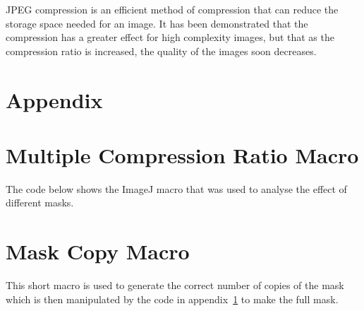 	JPEG compression is an efficient method of compression that can reduce the storage space needed for an image. It has been demonstrated that the compression has a greater effect for high complexity images, but that as the compression ratio is increased, the quality of the images soon decreases.

\section*{Appendix}
	\appendix


	\section{Multiple Compression Ratio Macro}
		\label{app:macro}
		The code below shows the ImageJ macro that was used to analyse the effect of different masks.
		\scriptsize

	\section{Mask Copy Macro}
		\label{app:macro2}
		This short macro is used to generate the correct number of copies of the mask which is then manipulated by the code in appendix~\ref{app:macro} to make the full mask.
		\scriptsize

